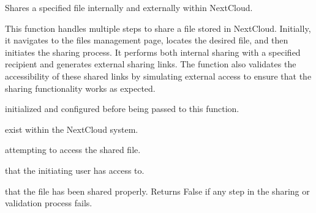 \documentclass[letterpaper,10pt,english]{sphinxmanual}
\begin{document}
\begin{fulllineitems}
\label{\detokenize{tests:tests.test_file_share.locate_and_click_share_button}}
\pysigstartsignatures
{}
\pysigstopsignatures
\sphinxAtStartPar
Shares a specified file internally and externally within NextCloud.

\sphinxAtStartPar
This function handles multiple steps to share a file stored in NextCloud. Initially, it navigates
to the files management page, locates the desired file, and then initiates the sharing process. It performs both
internal sharing with a specified recipient and generates external sharing links. The function also validates 
the accessibility of these shared links by simulating external access to ensure that the sharing functionality 
works as expected.
\begin{description}
\begin{description}
\sphinxAtStartPar
initialized and configured before being passed to this function.

\sphinxAtStartPar
exist within the NextCloud system.

\sphinxAtStartPar
attempting to access the shared file.

\sphinxAtStartPar
that the initiating user has access to.

\end{description}

\begin{description}
\sphinxAtStartPar
that the file has been shared properly. Returns False if any step in the sharing or validation process
fails.

\end{description}


\end{description}
\end{fulllineitems}
\end{document}
